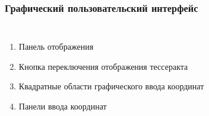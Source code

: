 \documentclass[10pt,pdf,hyperref={unicode}]{beamer}
\begin{document}
\begin{frame}
\begin{frame}
	\frametitle{Графический пользовательский интерфейс}
	\begin{columns}
			\begin{enumerate}
				\item Панель отображения
				\item Кнопка переключения отображения тессеракта
				\item Квадратные области графического ввода координат
				\item Панели ввода координат
			\end{enumerate}				
	\end{columns}
\end{frame}


\end{frame}
\end{document}
